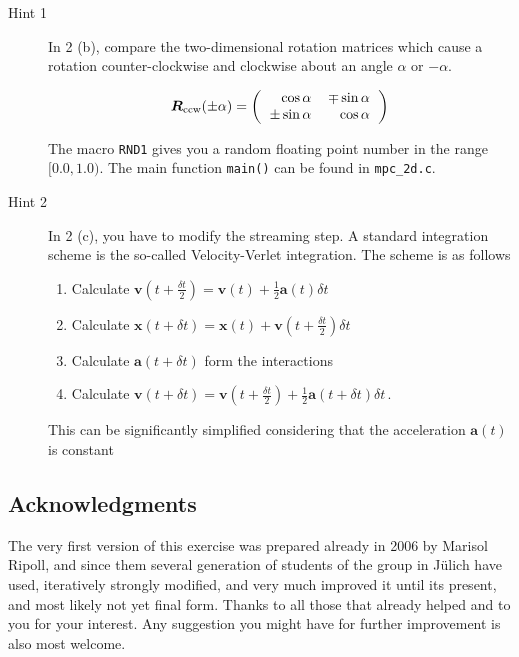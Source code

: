 \documentclass[sizes,12pt,nftimes]{article}
\begin{document}
\begin{description}
\item [Hint 1] In 2 (b), compare the two-dimensional rotation matrices
  which cause a rotation counter-clockwise and clockwise about an
  angle $\alpha$ or $-\alpha$.
		
  \begin{equation}
    \bm{R}_\mathrm{ccw}(\pm\alpha) = \left(
\begin{tabular}{rr} $\cos \alpha$ & $\mp \sin \alpha$ \\
     $\pm \sin \alpha$ & $\cos \alpha$
    \end{tabular} \right)
  \end{equation}
  
 The macro \texttt{RND1} gives you a random floating
 point number in the range $[0.0, 1.0)$. The main
  function \texttt{main()} can be found in
                \texttt{mpc\_2d.c}.
\item [Hint 2] In 2 (c), you have to modify the
                streaming step. A standard integration scheme is the
                so-called Velocity-Verlet integration. The scheme is
                as follows
\begin{enumerate}
  \item Calculate $\bm{v}(t + \frac{\delta t}{2}) = \bm{v}(t) + \frac{1}{2} \bm{a}(t) \delta t$
  \item Calculate $\bm{x}(t + \delta t) = \bm{x}(t) + \bm{v}(t + \frac{\delta t}{2}) \delta t$
  \item Calculate $\bm{a}(t + \delta t)$ form the interactions
  \item Calculate $\bm{v}(t + \delta t) = \bm{v}(t + \frac{\delta t}{2}) + \frac{1}{2} \bm{a}(t + \delta t) \delta t$\,.
\end{enumerate}
  This can be significantly simplified considering that the acceleration $\bm{a}(t)$ is constant 
\end{description}

\subsection*{Acknowledgments}
The very first version of this exercise was prepared already in 2006
by Marisol Ripoll, and since them several generation of students of
the group in J{\"u}lich have used, iteratively strongly modified, and
very much improved it until its present, and most likely not yet final
form. Thanks to all those that already helped and to you for your
interest. Any suggestion you might have for further improvement is
also most welcome.
\end{document}
